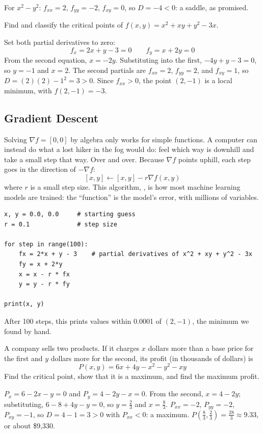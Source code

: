 For $x^2 - y^2$: $f_{xx} = 2$, $f_{yy} = -2$, $f_{xy} = 0$, so $D = -4 < 0$:
a saddle, as promised.

\begin{Worked}
\begin{Problem}
Find and classify the critical points of $f(x, y) = x^2 + xy +
y^2 - 3x$.
\end{Problem}
\begin{Solution}
Set both partial derivatives to zero:
$$f_x = 2x + y - 3 = 0 \qquad f_y = x + 2y = 0$$
From the second equation, $x = -2y$. Substituting into the first, $-4y + y
- 3 = 0$, so $y = -1$ and $x = 2$. The second partials are $f_{xx} = 2$,
$f_{yy} = 2$, and $f_{xy} = 1$, so $D = (2)(2) - 1^2 = 3 > 0$. Since
$f_{xx} > 0$, the point $(2, -1)$ is a local minimum, with $f(2, -1) =
-3$.
\end{Solution}
\end{Worked}

\subsection{Gradient Descent}

Solving $\nabla f = [0, 0]$ by algebra only works for simple functions. A
computer can instead do what a lost hiker in the fog would do: feel which
way is downhill and take a small step that way. Over and over. Because
$\nabla f$ points uphill, each step goes in the direction of $-\nabla f$:
$$[x, y] \leftarrow [x, y] - r \nabla f(x, y)$$
where $r$ is a small step size. This algorithm, , is how most machine learning models are trained: the
``function'' is the model's error, with millions of variables.

\begin{verbatim}
x, y = 0.0, 0.0     # starting guess
r = 0.1             # step size

for step in range(100):
    fx = 2*x + y - 3    # partial derivatives of x^2 + xy + y^2 - 3x
    fy = x + 2*y
    x = x - r * fx
    y = y - r * fy

print(x, y)
\end{verbatim}

After 100 steps, this prints values within 0.0001 of $(2, -1)$, the
minimum we found by hand.

\begin{Exercise}[title = {Finding a Maximum}, label = grad_max]
A company sells two products. If it charges $x$ dollars more than a base
price for the first and $y$ dollars more for the second, its profit (in
thousands of dollars) is
$$P(x, y) = 6x + 4y - x^2 - y^2 - xy$$
Find the critical point, show that it is a maximum, and find the maximum
profit.
\end{Exercise}
\begin{Answer}[ref = grad_max]
$P_x = 6 - 2x - y = 0$ and $P_y = 4 - 2y - x = 0$. From the second, $x = 4
- 2y$; substituting, $6 - 8 + 4y - y = 0$, so $y = \frac{2}{3}$ and $x =
\frac{8}{3}$. $P_{xx} = -2$, $P_{yy} = -2$, $P_{xy} = -1$, so $D = 4 - 1 =
3 > 0$ with $P_{xx} < 0$: a maximum. $P\left(\frac{8}{3},
\frac{2}{3}\right) = \frac{28}{3} \approx 9.33$, or about \$9,330.
\end{Answer}

